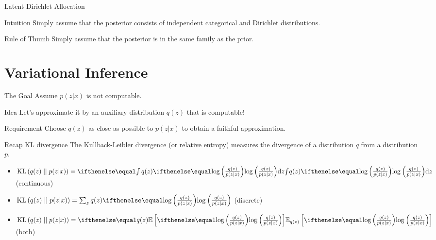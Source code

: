 \documentclass[14pt]{beamer}
\begin{document}
\begin{frame}{Latent Dirichlet Allocation}
\begin{block}{Intuition}
Simply assume that the posterior consists of independent categorical and Dirichlet distributions.
\end{block}
\pause
\begin{block}{Rule of Thumb}
Simply assume that the posterior is in the same family as the prior.
\end{block}
\end{frame}


\section{Variational Inference}
\frame{\tableofcontents[currentsection]}

\begin{frame}{The Goal}
Assume $ p(z|x) $ is not computable.
\pause
\begin{block}{Idea}
Let's approximate it by an auxiliary distribution $ q(z) $ that is computable!
\end{block}
\pause
\begin{block}{Requirement}
Choose $ q(z) $ as close as possible to $ p(z|x) $ to obtain a faithful approximation.
\end{block}
\end{frame}

\begin{frame}{Recap KL divergence}
The Kullback-Leibler divergence (or relative entropy) measures the divergence of a distribution $ q $ from 
a distribution $ p $. 
\begin{itemize}
\pause
\item $ \KL{q(z)}{p(z|x)} = \intl{ q(z) \loga{\frac{q(z)}{p(z|x)}}}{z} $ (continuous)
\pause
\item $ \KL{q(z)}{p(z|x)} = \sum_{z} q(z) \loga{\frac{q(z)}{p(z|x)}} $ (discrete)
\pause
\item $ \KL{q(z)}{p(z|x)} = \E[q(z)]{\loga{\frac{q(z)}{p(z|x)}}} $ (both)
\end{itemize}
\end{frame}

\end{document}
